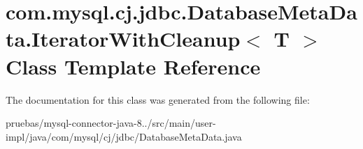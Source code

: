 \hypertarget{classcom_1_1mysql_1_1cj_1_1jdbc_1_1_database_meta_data_1_1_iterator_with_cleanup}{}\section{com.\+mysql.\+cj.\+jdbc.\+Database\+Meta\+Data.\+Iterator\+With\+Cleanup$<$ T $>$ Class Template Reference}
\label{classcom_1_1mysql_1_1cj_1_1jdbc_1_1_database_meta_data_1_1_iterator_with_cleanup}


The documentation for this class was generated from the following file\+:\begin{DoxyCompactItemize}
\item 
pruebas/mysql-\/connector-\/java-\/8../src/main/user-\/impl/java/com/mysql/cj/jdbc/Database\+Meta\+Data.\+java\end{DoxyCompactItemize}
